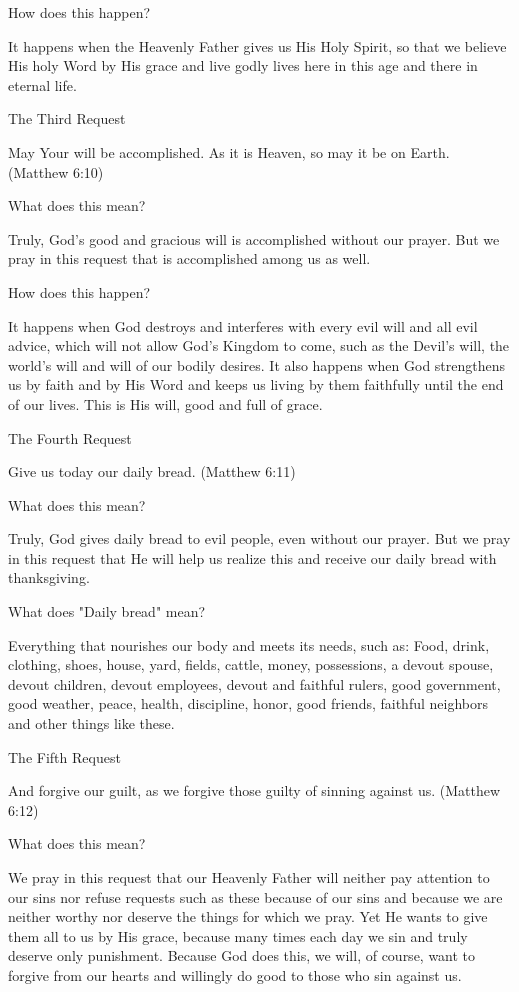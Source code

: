 How does this happen?

It happens when the Heavenly Father gives us His Holy Spirit, so that
we believe His holy Word by His grace and live godly lives here in this
age and there in eternal life.

The Third Request

May Your will be accomplished. As it is Heaven, so may it be on Earth.
(Matthew 6:10)

What does this mean?

Truly, God's good and gracious will is accomplished without our prayer.
But we pray in this request that is accomplished among us as well.

How does this happen?

It happens when God destroys and interferes with every evil will and
all evil advice, which will not allow God's Kingdom to come, such as
the Devil's will, the world's will and will of our bodily desires. It
also happens when God strengthens us by faith and by His Word and keeps
us living by them faithfully until the end of our lives. This is His
will, good and full of grace.

The Fourth Request

Give us today our daily bread. (Matthew 6:11)

What does this mean?

Truly, God gives daily bread to evil people, even without our prayer.
But we pray in this request that He will help us realize this and
receive our daily bread with thanksgiving.

What does "Daily bread" mean?

Everything that nourishes our body and meets its needs, such as: Food,
drink, clothing, shoes, house, yard, fields, cattle, money,
possessions, a devout spouse, devout children, devout employees, devout
and faithful rulers, good government, good weather, peace, health,
discipline, honor, good friends, faithful neighbors and other things
like these.

The Fifth Request

And forgive our guilt, as we forgive those guilty of sinning against
us. (Matthew 6:12)

What does this mean?

We pray in this request that our Heavenly Father will neither pay
attention to our sins nor refuse requests such as these because of our
sins and because we are neither worthy nor deserve the things for which
we pray. Yet He wants to give them all to us by His grace, because many
times each day we sin and truly deserve only punishment. Because God
does this, we will, of course, want to forgive from our hearts and
willingly do good to those who sin against us.

